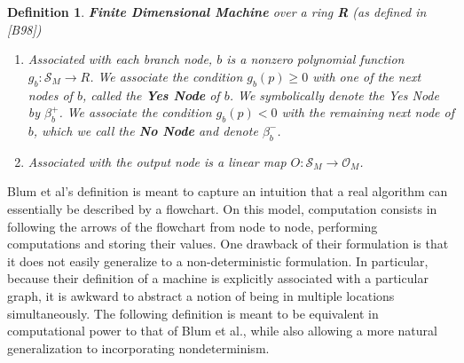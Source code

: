 \documentclass[twoside]{article}
\newcommand{\functype}[3]{$#1:#2 \rightarrow #3$}
\newcommand{\outspace}[0]{\mathcal{O}}
\newcommand{\statespace}[0]{\mathcal{S}}
\renewcommand{\cite}[1]{[#1]}
\newtheorem{definition}{Definition}[section]
\begin{document}
\begin{definition}{\textbf{Finite Dimensional Machine} over a ring
    \textbf{R} (as defined in \cite{B98})}
\begin{enumerate}
  \item Associated with each branch node, $b$ is a nonzero polynomial
    function \functype{g_b}{\statespace_M}{R}.  We associate the
    condition $g_b(p) \geq 0$ with one of the next nodes of $b$,
    called the \textbf{Yes Node} of $b$.  We symbolically denote the
    Yes Node by $\beta_b^+$. We associate the condition $g_b(p) < 0$
    with the remaining next node of $b$, which we call the \textbf{No
      Node} and denote $\beta_b^-$.
    
  \item Associated with the output node is a linear map
    \functype{O}{\statespace_M}{\outspace_M}.
    
  \end{enumerate}
\end{definition}

Blum et al's definition is meant to capture an intuition that a real
algorithm can essentially be described by a flowchart.  On this model,
computation consists in following the arrows of the flowchart from
node to node, performing computations and storing their values.  One
drawback of their formulation is that it does not easily generalize to
a non-deterministic formulation.  In particular, because their
definition of a machine is explicitly associated with a particular
graph, it is awkward to abstract a notion of being in multiple
locations simultaneously.  The following definition is meant to be
equivalent in computational power to that of Blum et al., while also
allowing a more natural generalization to incorporating nondeterminism.
\end{document}
